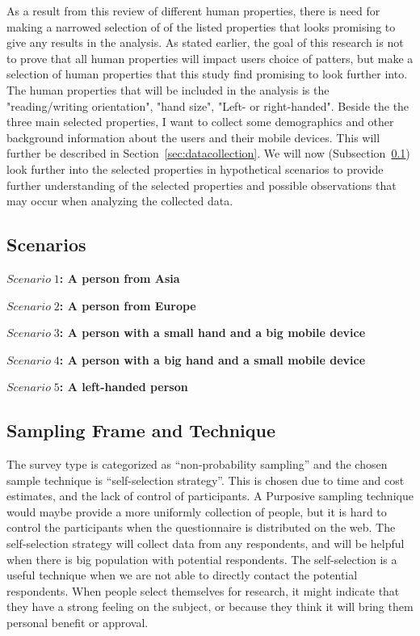   As a result from this review of different human properties, there is need for making a narrowed selection of of the listed properties that looks promising to give any results in the analysis. As stated earlier, the goal of this research is not to prove that all human properties will impact users choice of patters, but make a selection of human properties that this study find promising to look further into. The human properties that will be included in the analysis is the  "reading/writing orientation", "hand size", "Left- or right-handed". Beside the the three main selected properties, I want to collect some demographics and other background information about the users and their mobile devices. This will further be described in Section~\ref{sec:datacollection}. We will now (Subsection~\ref{sec:scenario}) look further into the selected properties in hypothetical scenarios to provide further understanding of the selected properties and possible observations that may occur when analyzing the collected data. 

  \subsection{Scenarios}\label{sec:scenario}

    {\bf $Scenario\; 1$: A person from Asia}

    {\bf $Scenario\; 2$: A person from Europe}

    {\bf $Scenario\; 3$: A person with a small hand and a big mobile device}

    {\bf $Scenario\; 4$: A person with a big hand and a small mobile device}

    {\bf $Scenario\; 5$: A left-handed person}

  \subsection{Sampling Frame and Technique} \label{sec:sampling}

    
    The survey type is categorized as ``non-probability sampling'' and the chosen sample technique is ``self-selection strategy''. This is chosen due to time and cost estimates, and the lack of control of participants. A Purposive sampling technique would maybe provide a more uniformly collection of people, but it is hard to control the participants when the questionnaire is distributed on the web. The self-selection strategy will collect data from any respondents, and will be helpful when there is big population with potential respondents. The self-selection is a useful technique when we are not able to directly contact the potential respondents. When people select themselves for research, it might indicate that they have a strong feeling on the subject, or because they think it will bring them personal benefit or approval. 

